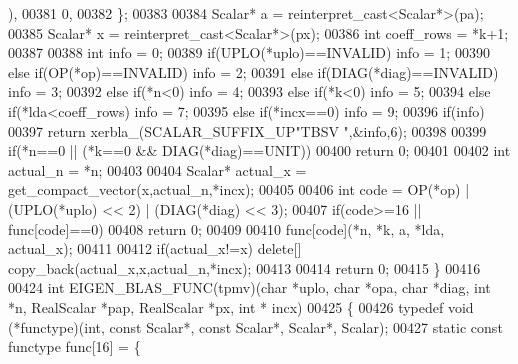 \begin{DoxyCode}
      ),
00381     0,
00382   \};
00383 
00384   Scalar* a = \textcolor{keyword}{reinterpret\_cast<}Scalar*\textcolor{keyword}{>}(pa);
00385   Scalar* x = \textcolor{keyword}{reinterpret\_cast<}Scalar*\textcolor{keyword}{>}(px);
00386   \textcolor{keywordtype}{int} coeff\_rows = *k+1;
00387 
00388   \textcolor{keywordtype}{int} info = 0;
00389        \textcolor{keywordflow}{if}(UPLO(*uplo)==INVALID)                                       info = 1;
00390   \textcolor{keywordflow}{else} \textcolor{keywordflow}{if}(OP(*op)==INVALID)                                           info = 2;
00391   \textcolor{keywordflow}{else} \textcolor{keywordflow}{if}(DIAG(*diag)==INVALID)                                       info = 3;
00392   \textcolor{keywordflow}{else} \textcolor{keywordflow}{if}(*n<0)                                                       info = 4;
00393   \textcolor{keywordflow}{else} \textcolor{keywordflow}{if}(*k<0)                                                       info = 5;
00394   \textcolor{keywordflow}{else} \textcolor{keywordflow}{if}(*lda<coeff\_rows)                                            info = 7;
00395   \textcolor{keywordflow}{else} \textcolor{keywordflow}{if}(*incx==0)                                                   info = 9;
00396   \textcolor{keywordflow}{if}(info)
00397     \textcolor{keywordflow}{return} xerbla\_(SCALAR\_SUFFIX\_UP\textcolor{stringliteral}{"TBSV "},&info,6);
00398 
00399   \textcolor{keywordflow}{if}(*n==0 || (*k==0 && DIAG(*diag)==UNIT))
00400     \textcolor{keywordflow}{return} 0;
00401 
00402   \textcolor{keywordtype}{int} actual\_n = *n;
00403 
00404   Scalar* actual\_x = get\_compact\_vector(x,actual\_n,*incx);
00405 
00406   \textcolor{keywordtype}{int} code = OP(*op) | (UPLO(*uplo) << 2) | (DIAG(*diag) << 3);
00407   \textcolor{keywordflow}{if}(code>=16 || func[code]==0)
00408     \textcolor{keywordflow}{return} 0;
00409 
00410   func[code](*n, *k, a, *lda, actual\_x);
00411 
00412   \textcolor{keywordflow}{if}(actual\_x!=x) \textcolor{keyword}{delete}[] copy\_back(actual\_x,x,actual\_n,*incx);
00413 
00414   \textcolor{keywordflow}{return} 0;
00415 \}
00416 
00424 \textcolor{keywordtype}{int} EIGEN\_BLAS\_FUNC(tpmv)(\textcolor{keywordtype}{char} *uplo, \textcolor{keywordtype}{char} *opa, \textcolor{keywordtype}{char} *diag, \textcolor{keywordtype}{int} *n, RealScalar *pap, RealScalar *px, \textcolor{keywordtype}{int} *
      incx)
00425 \{
00426   \textcolor{keyword}{typedef} void (*functype)(int, \textcolor{keyword}{const} Scalar*, \textcolor{keyword}{const} Scalar*, Scalar*, Scalar);
00427   \textcolor{keyword}{static} \textcolor{keyword}{const} functype func[16] = \{

\end{DoxyCode}
